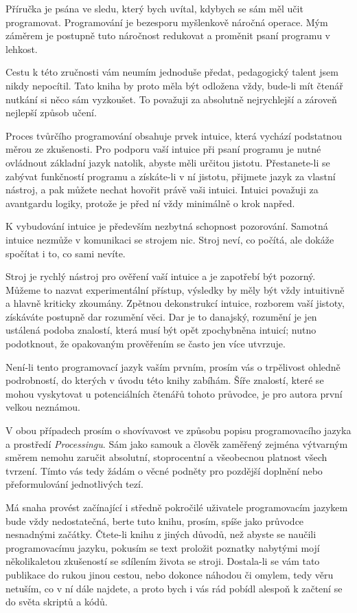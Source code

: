 \documentclass[10pt,twoside=true,open=right,cleardoublepage=empty,chapterprefix=true]{scrbook}
\newcommand{\lnb}{\linebreak}
\begin{document}
Příručka je psána ve sledu, který bych uvítal, kdybych se sám měl učit programovat. Programování je bezesporu myšlenkově náročná operace. Mým záměrem je postupně tuto náročnost redukovat a proměnit psaní programu v lehkost.

Cestu k této zručnosti vám neumím jednoduše předat, pedagogický talent jsem nikdy nepocítil. Tato kniha by proto měla být odložena vždy, bude-li mít čtenář nutkání si něco sám vyzkoušet. To považuji za absolutně nejrychlejší a zároveň nejlepší způsob učení.

Proces tvůrčího programování obsahuje prvek intuice, která vychází podstatnou měrou ze zkušenosti. Pro podporu vaší intuice při psaní programu je nutné ovládnout základní jazyk natolik, abyste měli určitou jistotu. Přestane\-te-li se zabývat funkčností programu a získáte-li v ní jistotu, přijmete jazyk za vlastní nástroj, a pak můžete nechat hovořit právě vaši intuici. Intuici považuji za avantgardu logiky, protože je před ní vždy minimálně o krok napřed.

K vybudování intuice je především nezbytná schopnost pozorování. Samotná intuice nezmůže v komunikaci se strojem nic. Stroj neví, co počítá, ale dokáže spočítat i to, co sami nevíte.

Stroj je rychlý nástroj pro ověření vaší intuice a je zapotřebí být pozorný. Můžeme to nazvat experimentální přístup, výsledky by měly být vždy intui\-tivně a hlavně kriticky zkoumány. Zpětnou dekonstrukcí intuice, rozborem vaší jistoty, získáváte postupně dar rozumění věci. Dar je to danajský, rozumění je jen ustálená podoba znalostí, která musí být opět zpochybněna intuicí; nutno podotknout, že opakovaným prověřením se často jen více utvrzuje. 

Není-li tento programovací jazyk vaším prvním, prosím vás o trpělivost ohledně podrobností, do kterých v úvodu této knihy zabíhám. Šíře znalostí, které se mohou vyskytovat u potenciálních čtenářů tohoto průvodce, je pro autora první velkou neznámou.

V obou případech prosím o shovívavost ve způsobu popisu programovacího jazyka a prostředí {\em Processingu}. Sám jako samouk a člověk zaměřený zejména výtvarným směrem nemohu zaručit absolutní, stoprocentní \lnb a všeobecnou platnost všech tvrzení. Tímto vás tedy žádám o věcné podněty pro pozdější doplnění nebo přeformulování jednotlivých tezí.

Má snaha provést začínající i středně pokročilé uživatele programovacím jazykem bude vždy nedostatečná, berte tuto knihu, prosím, spíše jako průvodce nesnadnými začátky. Čtete-li knihu z jiných důvodů, než abyste se naučili programovacímu jazyku, pokusím se text proložit poznatky nabytými mojí několikaletou zkušeností se sdílením života se stroji. Dosta\-la-li se vám tato publikace do rukou jinou cestou, nebo dokonce náhodou či omylem, tedy věru netuším, co v ní dále najdete, a proto bych i vás rád pobídl alespoň k začtení se do světa skriptů a kódů.
\end{document}
